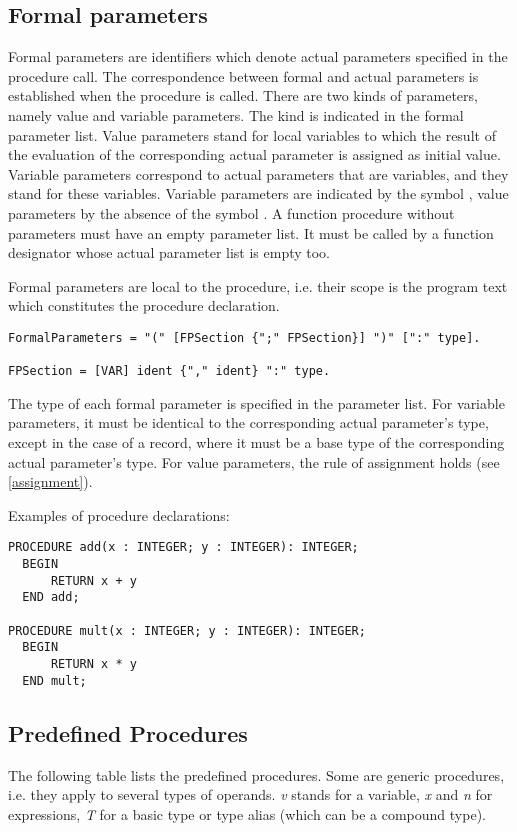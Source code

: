 \documentclass[12pt]{article}
\begin{document}
\subsection{Formal parameters}
\label{parameters}

Formal parameters are identifiers which denote actual parameters specified in the procedure call. The correspondence between formal and actual parameters is established when the procedure is called. There are two kinds of parameters, namely value and variable parameters. The kind is indicated in the formal parameter list. Value parameters stand for local variables to which the result of the evaluation of the corresponding actual parameter is assigned as initial value. Variable parameters correspond to actual parameters that are variables, and they stand for these variables. Variable parameters are indicated by the symbol \VAR, value parameters by the absence of the symbol \VAR. A function procedure without parameters must have an empty parameter list. It must be called by a function designator whose actual parameter list is empty too.

Formal parameters are local to the procedure, i.e. their scope is the program text which constitutes the procedure declaration.

\begin{lstlisting}[style=ebnf]
FormalParameters = "(" [FPSection {";" FPSection}] ")" [":" type]. 

FPSection = [VAR] ident {"," ident} ":" type.
\end{lstlisting} 

The type of each formal parameter is specified in the parameter list. For variable parameters, it must be identical to the corresponding actual parameter's type, except in the case of a record, where it must be a base type of the corresponding actual parameter's type. For value parameters, the rule of assignment holds (see \ref{assignment}).

Examples of procedure declarations:

\begin{lstlisting}[style=example]
PROCEDURE add(x : INTEGER; y : INTEGER): INTEGER;
  BEGIN
      RETURN x + y
  END add;

PROCEDURE mult(x : INTEGER; y : INTEGER): INTEGER;
  BEGIN
      RETURN x * y
  END mult;
\end{lstlisting} 

\subsection{Predefined Procedures}
\label{predefined}
The following table lists the predefined procedures. Some are generic procedures, i.e. they apply to several types of operands.
\emph{v} stands for a variable, \emph{x} and \emph{n} for expressions, \emph{T} for a basic type or type alias (which can be a compound type).
\end{document}
